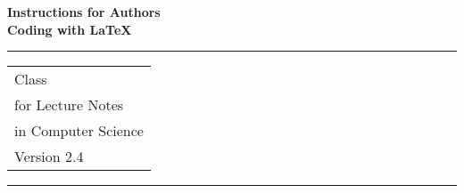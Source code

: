 \documentclass{llncs}
\begin{document}
\thispagestyle{empty}
\begin{flushleft}
\LARGE\bfseries Instructions for Authors\\
Coding with \LaTeX\\[2cm]
\end{flushleft}
\rule{\textwidth}{1pt}
\vspace{2pt}
\begin{flushright}
\Huge
\begin{tabular}{@{}l}
\LaTeXe{} Class\\
for Lecture Notes\\
in Computer Science\\[6pt]
{\Large Version 2.4}
\end{tabular}
\end{flushright}
\rule{\textwidth}{1pt}
\vfill
\newpage
%
\end{document}
